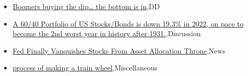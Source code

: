 \documentclass{article}%
\begin{document}
%
\begin{itemize}%
\item%
\href{https://reddit.com/r/wallstreetbets/comments/xn132c/boomers\_buying\_the\_dip\_the\_bottom\_is\_in/}{Boomers buying the dip… the bottom is in},DD%
\item%
\href{https://reddit.com/r/StockMarket/comments/xmum61/a\_6040\_portfolio\_of\_us\_stocksbonds\_is\_down\_193\_in/}{A 60/40 Portfolio of US Stocks/Bonds is down 19.3\% in 2022, on pace to become the 2nd worst year in history after 1931.},Discussion%
\item%
\href{https://reddit.com/r/Economics/comments/xmxqqp/fed\_finally\_vanquishes\_stocks\_from\_asset/}{Fed Finally Vanquishes Stocks From Asset Allocation Throne},News%
\item%
\href{https://reddit.com/r/railroading/comments/xmw2sp/process\_of\_making\_a\_train\_wheel/}{process of making a train wheel},Miscellaneous%
\end{itemize}%
\end{document}
